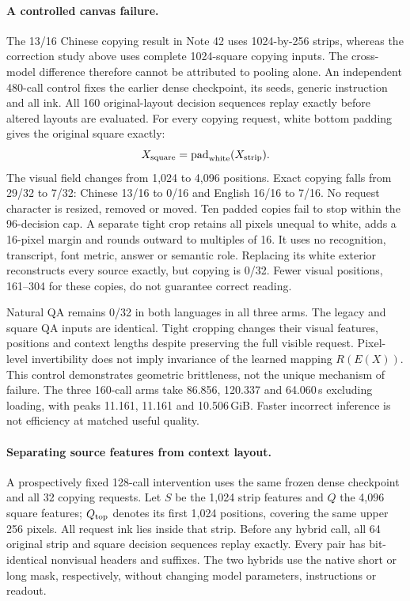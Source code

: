 \paragraph{A controlled canvas failure.}
The 13/16 Chinese copying result in Note 42 uses 1024-by-256 strips, whereas
the correction study above uses complete 1024-square copying inputs. The
cross-model difference therefore cannot be attributed to pooling alone.
An independent 480-call control fixes the earlier dense checkpoint, its
seeds, generic instruction and all ink. All 160 original-layout decision
sequences replay exactly before altered layouts are evaluated. For every
copying request, white bottom padding gives the original square exactly:
\[
 X_{\rm square}=\operatorname{pad}_{\rm white}(X_{\rm strip}).
\]
The visual field changes from 1,024 to 4,096 positions. Exact copying falls
from 29/32 to 7/32: Chinese 13/16 to 0/16 and English 16/16 to 7/16.
No request character is resized, removed or moved. Ten padded copies fail
to stop within the 96-decision cap. A separate tight crop retains all pixels
unequal to white, adds a 16-pixel margin and rounds outward to multiples
of 16. It uses no recognition, transcript, font metric, answer or semantic
role. Replacing its white exterior reconstructs every source exactly, but
copying is 0/32. Fewer visual positions, 161--304 for these copies, do not
guarantee correct reading.

Natural QA remains 0/32 in both languages in all three arms. The legacy and
square QA inputs are identical. Tight cropping changes their visual features,
positions and context lengths despite preserving the full visible request.
Pixel-level invertibility does not imply invariance of the learned mapping
$R(E(X))$. This control demonstrates geometric brittleness, not the unique
mechanism of failure. The three 160-call arms take 86.856, 120.337 and
64.060\,s excluding loading, with peaks 11.161, 11.161 and 10.506\,GiB.
Faster incorrect inference is not efficiency at matched useful quality.

\paragraph{Separating source features from context layout.}
A prospectively fixed 128-call intervention uses the same frozen dense
checkpoint and all 32 copying requests. Let $S$ be the 1,024 strip features
and $Q$ the 4,096 square features; $Q_{\rm top}$ denotes its first 1,024
positions, covering the same upper 256 pixels. All request ink lies inside
that strip. Before any hybrid call, all 64 original strip and square
decision sequences replay exactly. Every pair has bit-identical nonvisual
headers and suffixes. The two hybrids use the native short or long mask,
respectively, without changing model parameters, instructions or readout.

